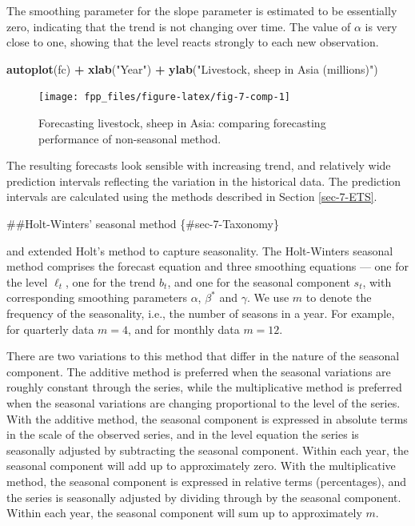 \documentclass[]{book}
\newenvironment{Shaded}{\begin{snugshade}}{\end{snugshade}}
\newcommand{\KeywordTok}[1]{\textcolor[rgb]{0.13,0.29,0.53}{\textbf{#1}}}
\newcommand{\NormalTok}[1]{#1}
\newcommand{\OperatorTok}[1]{\textcolor[rgb]{0.81,0.36,0.00}{\textbf{#1}}}
\newcommand{\StringTok}[1]{\textcolor[rgb]{0.31,0.60,0.02}{#1}}
\begin{document}
The smoothing parameter for the slope parameter is estimated to be essentially zero, indicating that the trend is not changing over time. The value of \(\alpha\) is very close to one, showing that the level reacts strongly to each new observation.

\begin{Shaded}
\begin{Highlighting}[]
\KeywordTok{autoplot}\NormalTok{(fc) }\OperatorTok{+}
\StringTok{  }\KeywordTok{xlab}\NormalTok{(}\StringTok{"Year"}\NormalTok{) }\OperatorTok{+}\StringTok{ }\KeywordTok{ylab}\NormalTok{(}\StringTok{"Livestock, sheep in Asia (millions)"}\NormalTok{)}
\end{Highlighting}
\end{Shaded}

\begin{figure}

{\centering \texttt{[image: fpp\_files/figure-latex/fig-7-comp-1]} 

}

\caption{Forecasting livestock, sheep in Asia: comparing forecasting performance of non-seasonal method.}\label{fig:fig-7-comp}
\end{figure}

The resulting forecasts look sensible with increasing trend, and relatively wide prediction intervals reflecting the variation in the historical data. The prediction intervals are calculated using the methods described in Section \ref{sec-7-ETS}.

\#\#Holt-Winters' seasonal method \{\#sec-7-Taxonomy\}

\citet{Holt57} and \citet{Winters60} extended Holt's method to capture seasonality. The Holt-Winters seasonal method comprises the forecast equation and three smoothing equations --- one for the level \(\ell_t\), one for the trend \(b_t\), and one for the seasonal component \(s_t\), with corresponding smoothing parameters \(\alpha\), \(\beta^*\) and \(\gamma\). We use \(m\) to denote the frequency of the seasonality, i.e., the number of seasons in a year. For example, for quarterly data \(m=4\), and for monthly data \(m=12\).

There are two variations to this method that differ in the nature of the seasonal component. The additive method is preferred when the seasonal variations are roughly constant through the series, while the multiplicative method is preferred when the seasonal variations are changing proportional to the level of the series. With the additive method, the seasonal component is expressed in absolute terms in the scale of the observed series, and in the level equation the series is seasonally adjusted by subtracting the seasonal component. Within each year, the seasonal component will add up to approximately zero. With the multiplicative method, the seasonal component is expressed in relative terms (percentages), and the series is seasonally adjusted by dividing through by the seasonal component. Within each year, the seasonal component will sum up to approximately \(m\).
\end{document}
